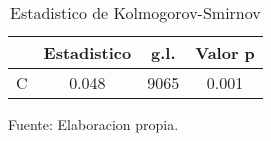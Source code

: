 \begin{table}[H]
\centering
\begin{tabular}{c|c|c|c|}
\cline{2-4}
                                & Estadistico & g.l. & Valor p \\ \hline
\multicolumn{1}{|c|}{C} & 0.048        & 9065 & 0.001    \\ \hline
\end{tabular}
\caption{Estadistico de Kolmogorov-Smirnov}
Fuente: Elaboracion propia.
\label{KStable}
\end{table}
